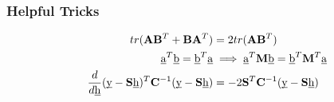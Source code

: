 \begin{mdframed}[style=eqbox]
\subsubsection{Helpful Tricks}
\vspace*{-10pt}
\begin{align*}
  tr(\mathbf{A}\mathbf{B}^T + \mathbf{B}\mathbf{A}^T) &= 2tr(\mathbf{A}\mathbf{B}^T)\\
  \underbar{a}^T\underbar{b} = \underbar{b}^T\underbar{a} &\implies \underbar{a}^T \mathbf{M} \underbar{b} = \underbar{b}^T \mathbf{M}^T \underbar{a}\\
  \frac{d}{d\underbar{h}} (\underbar{y} - \mathbf{S}\underbar{h})^T \mathbf{C}^{-1} (\underbar{y} - \mathbf{S}\underbar{h}) &= -2 \mathbf{S}^T \mathbf{C}^{-1} (\underbar{y} - \mathbf{S}\underbar{h})
\end{align*}
\end{mdframed}